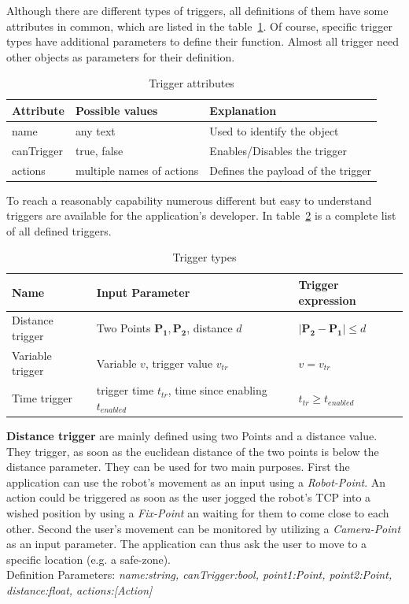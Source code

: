 Although there are different types of triggers, all definitions of them have some attributes in common, which are listed in the table~\ref{Table:TriggerAttributes}. Of course, specific trigger types have additional parameters to define their function. Almost all trigger need other objects as parameters for their definition.

 \begin{table}[!h]
 	\caption{Trigger attributes}
 	\label{Table:TriggerAttributes}
 	\centering
 	\begin{tabular}{lll}
 		\toprule
 		Attribute & Possible values		& Explanation	\\		
 		\midrule
 		name & any text & Used to identify the object \\
 		canTrigger & true, false		& Enables/Disables the trigger \\
 		actions & multiple names of actions & Defines the payload of the trigger \\
 		\bottomrule
 	\end{tabular}
 \end{table}

To reach a reasonably capability numerous different but easy to understand triggers are available for the application's developer. In table~\ref{Table:Triggers} is a complete list of all defined triggers.

 
 \begin{table}
 	\caption{Trigger types}
 	\label{Table:Triggers}
 	\centering
 	\begin{tabular}{lll}
 		\toprule
 		Name & Input Parameter		& Trigger expression	\\		
 		\midrule
 		Distance trigger & Two Points $\boldsymbol{P_1}, \boldsymbol{P_2}$, distance $d$		&  $|\boldsymbol{P_2}-\boldsymbol{P_1}| \le d$ \\
		Variable trigger & Variable $v$, trigger value $v_{tr}$ 		& $v = v_{tr}$	 \\
		Time trigger & trigger time $t_{tr}$, time since enabling $t_{enabled}$ & $t_{tr} \geq t_{enabled}$\\
		\bottomrule
	\end{tabular}
\end{table}

\textbf{Distance trigger} are mainly defined using two Points and a distance value. They trigger, as soon as the euclidean distance of the two points is below the distance parameter. They can be used for two main purposes. First the application can use the robot's movement as an input using a \textit{Robot-Point}. An action could be triggered as soon as the user jogged the robot's TCP into a wished position by using a \textit{Fix-Point} an waiting for them to come close to each other. Second the user's movement can be monitored by utilizing a \textit{Camera-Point} as an input parameter. The application can thus ask the user to move to a specific location (e.g. a safe-zone).\\Definition Parameters: \textit{name:string, canTrigger:bool, point1:Point, point2:Point, distance:float, actions:[Action] }

